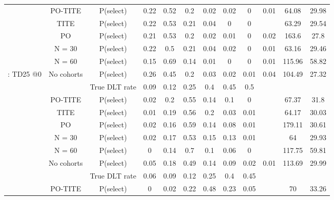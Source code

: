 \begin{table}
\begin{singlespace}
{\begin{tabular}[t]{cccccccccccc}
				& PO-TITE & P(select) & 0.22 & 0.52 & 0.2 & 0.02 & 0.02 & 0 & 0.01 & 64.08 & 29.98\\
				
				& TITE & P(select) & 0.22 & 0.53 & 0.21 & 0.04 & 0 & 0 &  & 63.29 & 29.54\\
				
				& PO & P(select) & 0.21 & 0.53 & 0.2 & 0.02 & 0.01 & 0 & 0.02 & 163.6 & 27.8\\
				
				& N = 30 & P(select) & 0.22 & 0.5 & 0.21 & 0.04 & 0.02 & 0 & 0.01 & 63.16 & 29.46\\
				
				& N = 60 & P(select) & 0.15 & 0.69 & 0.14 & 0.01 & 0 & 0 & 0.01 & 115.96 & 58.82\\
				
				\multirow{-7}{*}{\centering\arraybackslash 2: TD25 @0} & No cohorts & P(select) & 0.26 & 0.45 & 0.2 & 0.03 & 0.02 & 0.01 & 0.04 & 104.49 & 27.32\\
				\cmidrule{1-12}
				\rowcolor{gray!6}   &  & True DLT rate & 0.09 & 0.12 & 0.25 & 0.4 & 0.45 & 0.5 &  &  & \\
				
				\rowcolor{gray!6}   & PO-TITE & P(select) & 0.02 & 0.2 & 0.55 & 0.14 & 0.1 & 0 &  & 67.37 & 31.8\\
				
				\rowcolor{gray!6}   & TITE & P(select) & 0.01 & 0.19 & 0.56 & 0.2 & 0.03 & 0.01 &  & 64.17 & 30.03\\
				
				\rowcolor{gray!6}   & PO & P(select) & 0.02 & 0.16 & 0.59 & 0.14 & 0.08 & 0.01 &  & 179.11 & 30.61\\
				
				\rowcolor{gray!6}   & N = 30 & P(select) & 0.02 & 0.17 & 0.53 & 0.15 & 0.13 & 0.01 &  & 64 & 29.93\\
				
				\rowcolor{gray!6}   & N = 60 & P(select) & 0 & 0.14 & 0.7 & 0.1 & 0.06 & 0 &  & 117.75 & 59.81\\
				
				\rowcolor{gray!6}  \multirow{-7}{*}{\centering\arraybackslash 3: TD25 @1} & No cohorts & P(select) & 0.05 & 0.18 & 0.49 & 0.14 & 0.09 & 0.02 & 0.01 & 113.69 & 29.99\\
				\cmidrule{1-12}
				&  & True DLT rate & 0.06 & 0.09 & 0.12 & 0.25 & 0.4 & 0.45 &  &  & \\
				
				& PO-TITE & P(select) & 0 & 0.02 & 0.22 & 0.48 & 0.23 & 0.05 &  & 70 & 33.26\\
				

\end{tabular}}
\end{singlespace}
\end{table}

